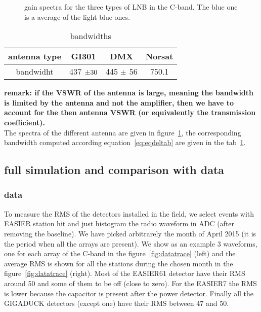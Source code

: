 \begin{figure}[!ht]
  \centering
  \hspace*{-3ex}
  \caption{gain spectra for the three types of LNB in the C-band. The blue one is a average of the light blue ones.}
  \label{fig:spectra}
\end{figure}

\begin{table}[h!]
  \centering
  \caption{bandwidths}
  \label{tab:tabdeltab}
  \begin{tabular}{|c||c|c|c|}
    \hline
    antenna type & GI301  & DMX & Norsat \\
    \hline
    bandwidht & 437 $\rm \pm 30$& 445 $\rm \pm$ 56 & 750.1\\
    \hline
  \end{tabular}
\end{table}




\textbf{remark:  if the  VSWR of  the  antenna is  large, meaning  the
  bandwidth is limited  by the antenna and not  the amplifier, then we
  have  to account  for the  then  antenna VSWR  (or equivalently  the
  transmission coefficient).}\\  The spectra of  the different antenna
are  given in  figure~\ref{fig:spectra},  the corresponding  bandwidth
computed   according  equation~\ref{eq:eqdeltab}   are   given  in   the
tab~\ref{tab:tabdeltab}.

\subsection{full simulation and comparison with data}
\subsubsection{data}
To measure the RMS of the  detectors installed in the field, we select
events with EASIER  station hit and just histogram  the radio waveform
in ADC (after  removing the baseline). We have  picked arbitrarely the
month  of  April 2015  (it  is  the period  when  all  the arrays  are
present).  We  show as an example  3 waveforms, one for  each array of
the C-band  in the  figure~\ref{fig:datatrace} (left) and  the average
RMS  is shown  for all  the stations  during the  chosen month  in the
figure~\ref{fig:datatrace} (right). Most of the EASIER61 detector have
their RMS around  50 and some of  them to be off (close  to zero). For
the EASIER7  the RMS is lower  because the capacitor  is present after
the power  detector. Finally all  the GIGADUCK detectors  (except one)
have their RMS between 47 and 50.

